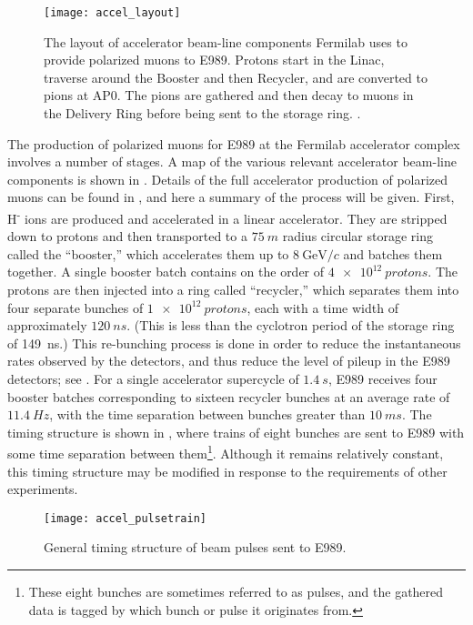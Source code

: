 \begin{figure}[]
    \centering
    \texttt{[image: accel\_layout]}
    \caption[Fermilab accelerator layout for muon delivery to E989]{The layout of accelerator beam-line components Fermilab uses to provide polarized muons to E989. Protons start in the Linac, traverse around the Booster and then Recycler, and are converted to pions at AP0. The pions are gathered and then decay to muons in the Delivery Ring before being sent to the \gmtwo storage ring. \cite{TDR}.}
    \label{fig:accelerator}
\end{figure}

The production of polarized muons for E989 at the Fermilab accelerator complex involves a number of stages. A map of the various relevant accelerator beam-line components is shown in . Details of the full accelerator production of polarized muons can be found in , and here a summary of the process will be given. First, H\textsuperscript{-} ions are produced and accelerated in a linear accelerator. They are stripped down to protons and then transported to a $\SI{75}{m}$ radius circular storage ring called the ``booster,'' which accelerates them up to $\SI{8}{\GeV/c}$ and batches them together. A single booster batch contains on the order of $\SI{4e12}{protons}$. The protons are then injected into a ring called ``recycler,'' which separates them into four separate bunches of $\SI{1e12}{protons}$, each with a time width of approximately $\SI{120}{ns}$. (This is less than the cyclotron period of the storage ring of \SI{149}{ns}.) This re-bunching process is done in order to reduce the instantaneous rates observed by the detectors, and thus reduce the level of pileup in the E989 detectors; see . For a single accelerator supercycle of $\SI{1.4}{s}$, E989 receives four booster batches corresponding to sixteen recycler bunches at an average rate of $\SI{11.4}{Hz}$, with the time separation between bunches greater than $\SI{10}{ms}$. The timing structure is shown in , where trains of eight bunches are sent to E989 with some time separation between them\footnote{These eight bunches are sometimes referred to as pulses, and the gathered data is tagged by which bunch or pulse it originates from.}. Although it remains relatively constant, this timing structure may be modified in response to the requirements of other experiments.

\begin{figure}[]
    \centering
    \texttt{[image: accel\_pulsetrain]}
    \caption[Fermilab accelerator pulse train]{General timing structure of beam pulses sent to E989.}   
    \label{fig:pulsetrain}
\end{figure}


